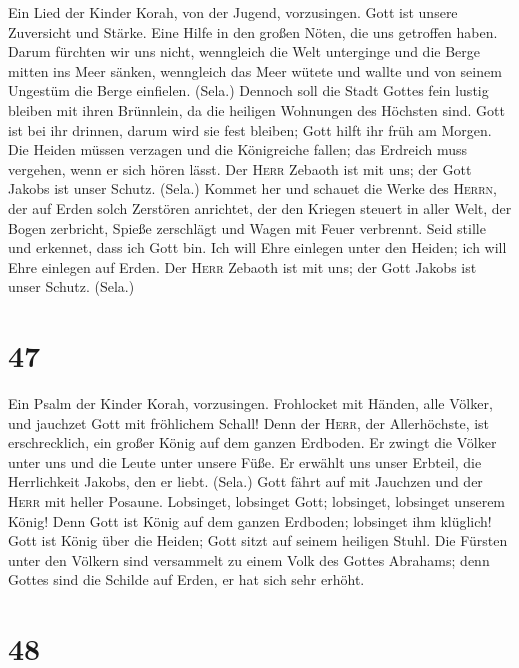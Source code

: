  Ein Lied der Kinder Korah, von der Jugend, vorzusingen.
 Gott ist unsere Zuversicht und Stärke. Eine Hilfe in den
großen Nöten, die uns getroffen haben.  Darum fürchten wir
uns nicht, wenngleich die Welt unterginge und die Berge mitten ins Meer
sänken,  wenngleich das Meer wütete und wallte und von
seinem Ungestüm die Berge einfielen. (Sela.)  Dennoch soll
die Stadt Gottes fein lustig bleiben mit ihren Brünnlein, da die
heiligen Wohnungen des Höchsten sind.  Gott ist bei ihr
drinnen, darum wird sie fest bleiben; Gott hilft ihr früh am Morgen.
 Die Heiden müssen verzagen und die Königreiche fallen;
das Erdreich muss vergehen, wenn er sich hören lässt.  Der
\textsc{Herr} Zebaoth ist mit uns; der Gott Jakobs ist unser Schutz.
(Sela.)  Kommet her und schauet die Werke des
\textsc{Herrn}, der auf Erden solch Zerstören anrichtet, 
der den Kriegen steuert in aller Welt, der Bogen zerbricht, Spieße
zerschlägt und Wagen mit Feuer verbrennt.  Seid stille
und erkennet, dass ich Gott bin. Ich will Ehre einlegen unter den
Heiden; ich will Ehre einlegen auf Erden.  Der
\textsc{Herr} Zebaoth ist mit uns; der Gott Jakobs ist unser Schutz.
(Sela.)

\hypertarget{section-46}{%
\section{47}\label{section-46}}

 Ein Psalm der Kinder Korah, vorzusingen. 
Frohlocket mit Händen, alle Völker, und jauchzet Gott mit fröhlichem
Schall!  Denn der \textsc{Herr}, der Allerhöchste, ist
erschrecklich, ein großer König auf dem ganzen Erdboden. 
Er zwingt die Völker unter uns und die Leute unter unsere Füße.
 Er erwählt uns unser Erbteil, die Herrlichkeit Jakobs,
den er liebt. (Sela.)  Gott fährt auf mit Jauchzen und der
\textsc{Herr} mit heller Posaune.  Lobsinget, lobsinget
Gott; lobsinget, lobsinget unserem König!  Denn Gott ist
König auf dem ganzen Erdboden; lobsinget ihm klüglich! 
Gott ist König über die Heiden; Gott sitzt auf seinem heiligen Stuhl.
 Die Fürsten unter den Völkern sind versammelt zu einem
Volk des Gottes Abrahams; denn Gottes sind die Schilde auf Erden, er hat
sich sehr erhöht.

\hypertarget{section-47}{%
\section{48}\label{section-47}}

